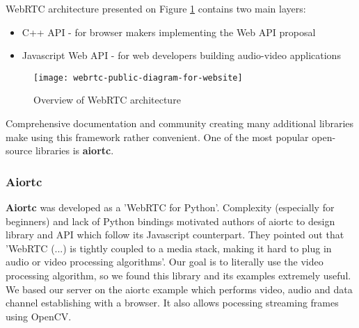 \documentclass[../Main.tex]{subfiles}
\begin{document}
    WebRTC architecture presented on  Figure \ref{fig:webrtc-public-diagram-for-website} contains two main layers: 
    \begin{itemize}
    \item C++ API - for browser makers implementing the Web API proposal
    \item Javascript Web API - for web developers building audio-video applications \\
    \end{itemize}
    
    \begin{figure}[h]
    \centering
    \texttt{[image: webrtc-public-diagram-for-website]}
    \caption{Overview of WebRTC architecture}
    \label{fig:webrtc-public-diagram-for-website}
    \end{figure}

    Comprehensive documentation and community creating many additional libraries make using this framework rather convenient. One of the most popular open-source libraries is \textbf{aiortc}.
    
    \subsubsection{Aiortc}
    \textbf{Aiortc} was developed as a 'WebRTC for Python'. Complexity (especially for beginners) and lack of Python bindings motivated authors of aiortc to design library and API which follow its Javascript counterpart. They pointed out that 
    'WebRTC (...) is tightly coupled to a media stack, making it hard to plug in audio or video processing algorithms'. Our goal is to literally use the video processing algorithm, so we found this library and its examples extremely useful.
    We based our server on the aiortc example which performs video, audio and data channel establishing with a browser. It also allows pocessing streaming frames using OpenCV. 
    
\end{document}
